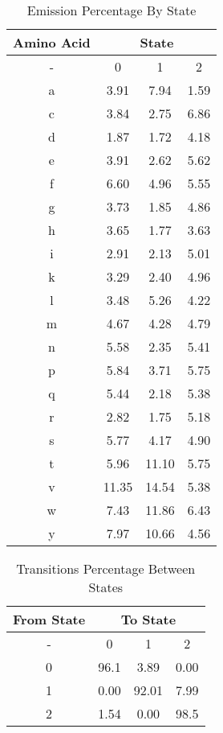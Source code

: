 \documentclass[a4paper,11pt]{article}
\begin{document}
\begin{table}[!hbp]
    \centering
    \caption{Emission Percentage By State}
    \vspace{0.5cm}
    \begin{tabular}{|c|c  c  c|}
        \hline
        \textbf{Amino Acid} & \multicolumn{3}{|c|}{\textbf{State}} \\
        \hline
        -  &  0 & 1 & 2 \\
        \hline
        a & 3.91 & 7.94 & 1.59 \\
        \hline
        c & 3.84 & 2.75 & 6.86 \\
        \hline
        d & 1.87 & 1.72 & 4.18 \\
        \hline
        e & 3.91 & 2.62 & 5.62 \\
        \hline
        f & 6.60 & 4.96 & 5.55 \\
        \hline
        g & 3.73 & 1.85 & 4.86 \\
        \hline
        h & 3.65 & 1.77 & 3.63 \\
        \hline
        i & 2.91 & 2.13 & 5.01 \\
        \hline
        k & 3.29 & 2.40 & 4.96 \\
        \hline
        l & 3.48 & 5.26 & 4.22 \\
        \hline
        m & 4.67 & 4.28 & 4.79 \\
        \hline
        n & 5.58 & 2.35 & 5.41 \\
        \hline
        p & 5.84 & 3.71 & 5.75 \\
        \hline
        q & 5.44 & 2.18 & 5.38 \\
        \hline
        r & 2.82 & 1.75 & 5.18 \\
        \hline
        s & 5.77 & 4.17 & 4.90 \\
        \hline
        t & 5.96 & 11.10 & 5.75 \\
        \hline
        v & 11.35 & 14.54 & 5.38 \\
        \hline
        w & 7.43 & 11.86 & 6.43 \\
        \hline
        y & 7.97 & 10.66 & 4.56 \\
        \hline
    \end{tabular}
    \label{emissions}
\end{table}


\begin{table}[!hbp]
    \centering
    \caption{Transitions Percentage Between States }
    \vspace{0.5cm}
    \begin{tabular}{|c|c c c|}
        \hline
        \textbf{From State} & \multicolumn{3}{c|}{\textbf{To State}} \\
        \hline
        - & 0 & 1 & 2 \\
        \hline
        0 & 96.1 & 3.89 & 0.00 \\
        1 & 0.00 & 92.01 & 7.99 \\
        2 & 1.54 & 0.00 & 98.5 \\
        \hline
    \end{tabular}
    \label{transitions}
\end{table}
\end{document}
